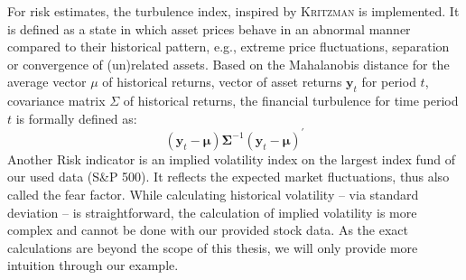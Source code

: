 \documentclass[12pt]{article}
\begin{document}
For risk estimates, the turbulence index, inspired by \textsc{Kritzman} \cite{Kritzman2010} is implemented.  It is defined as a state in which asset prices behave in an abnormal manner compared to their historical pattern, e.g., extreme price fluctuations, separation or convergence of 
(un)related assets. Based on the Mahalanobis distance for the average vector $\mu$ of historical returns,  vector of asset returns $\mathbf{y}_{t}$ for period $t$,   covariance matrix $\Sigma$ of historical returns, the financial turbulence for time period $t$ is formally defined as:
$$
\left(\mathbf{y}_{{t}}-\boldsymbol{\mu}\right) \boldsymbol{\Sigma}^{-1}\left(\mathbf{y}_{{t}}-\boldsymbol{\mu}\right)^{\prime}
$$
Another Risk indicator is an implied volatility index on the largest index fund of our used data (S\&P 500). It reflects the expected market fluctuations, thus also called the fear factor. While calculating historical volatility -- via standard deviation -- is straightforward, the calculation of implied volatility is more complex and cannot be done with our provided stock data. As the exact calculations are beyond the scope of this thesis, we will only provide more intuition through our example.
\begin{table}[ht!] \centering 
 
  \label{tab:options} 
 \caption[Example for options]{\small Let us consider three \textit{call} options - entailing the right to \textit{buy} the underlying stock - with comparable prices on the stock market (spot price). The strike price of an option is the price at which the underlying asset can be bought until the date of maturity. We have selected strike prices, that are comparable to spot prices (i.e. (\textit{at-the-money} options), thereby rendering options devoid of intrinsic value. An instance may be a call option, with a strike price of 105.00 and a spot price of 125.00, possessing an intrinsic value of 20.00, consequent to immediate arbitrage opportunities.  \normalsize} 
\end{table} 
\end{document}
